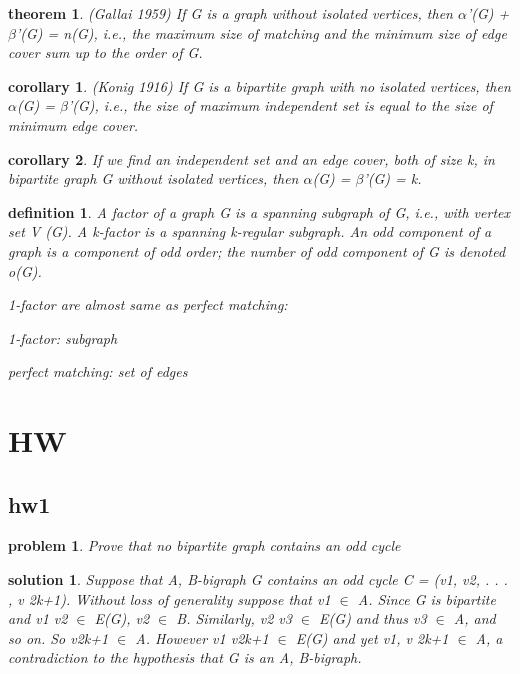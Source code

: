 \documentclass[twocolumn]{article}
\newtheorem{theorem}{theorem}[section]  %
\newtheorem{definition}{definition}
\newtheorem{corollary}{corollary}
\newtheorem{problem}{problem}
\newtheorem{solution}{solution}
\begin{document}
\begin{CJK*}{UTF8}{bkai}
    \begin{theorem}{(Gallai 1959)}
        If G is a graph without isolated vertices, then $\alpha$'(G) + $\beta$'(G) = n(G), i.e., the
 maximum size of matching and the minimum size of edge cover sum up to the
 order of G.
    \end{theorem}

    \begin{corollary}{(Konig 1916)}
        If G is a bipartite graph with no isolated vertices, then $\alpha$(G) = $\beta$'(G), i.e., the
 size of maximum independent set is equal to the size of minimum edge cover.
    \end{corollary}

    \begin{corollary}
        If we find an independent set and an edge cover, both of size k, in bipartite
 graph G without isolated vertices, then $\alpha$(G) = $\beta$'(G) = k.
    \end{corollary}

    \begin{definition}
        A factor of a graph G is a spanning subgraph of G, i.e., with vertex set V (G).
 A k-factor is a spanning k-regular subgraph. An odd component of a graph is
 a component of odd order; the number of odd component of G is denoted o(G).

 1-factor are almost same as perfect matching:

 1-factor: subgraph
 
 perfect matching: set of edges
    \end{definition}

\section{HW}
\subsection{hw1}
    \begin{problem}
 Prove that no bipartite graph contains an odd cycle    
    \end{problem}
    
    \begin{solution}
    Suppose that A, B-bigraph G contains an odd cycle C = (v1, v2, . . . , v 2k+1). Without loss of generality suppose that v1 $\in$ A. Since G is bipartite and v1 v2 $\in$ E(G), v2 $\in$ B. Similarly, v2 v3 $\in$ E(G)
and thus v3 $\in$ A, and so on. So v2k+1 $\in$ A. However v1 v2k+1 $\in$ E(G) and yet v1, v 2k+1 $\in$ A, a
contradiction to the hypothesis that G is an A, B-bigraph.


\end{solution}
\end{CJK*}
\end{document}
